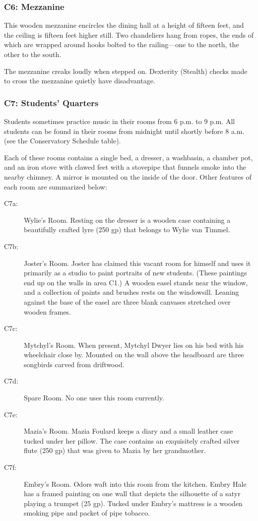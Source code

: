 \documentclass[10pt,a4paper,twoside,bg=print,twocolumn,openany,nodeprecatedcode]{dndbook}
\begin{document}
\subsubsection{C6: Mezzanine}
\begin{DndReadAloud}{}
This wooden mezzanine encircles the dining hall at a height of fifteen feet, and the ceiling is fifteen feet higher still. Two chandeliers hang from ropes, the ends of which are wrapped around hooks bolted to the railing—one to the north, the other to the south.

\end{DndReadAloud}

The mezzanine creaks loudly when stepped on. Dexterity (Stealth) checks made to cross the mezzanine quietly have disadvantage.

\subsubsection{C7: Students' Quarters}
Students sometimes practice music in their rooms from 6 p.m. to 9 p.m. All students can be found in their rooms from midnight until shortly before 8 a.m. (see the Conservatory Schedule table).

Each of these rooms contains a single bed, a dresser, a washbasin, a chamber pot, and an iron stove with clawed feet with a stovepipe that funnels smoke into the nearby chimney. A mirror is mounted on the inside of the door. Other features of each room are summarized below:


\begin{description}
\item[C7a:]
Wylie's Room. Resting on the dresser is a wooden case containing a beautifully crafted lyre (250 gp) that belongs to Wylie van Timmel.
\item[C7b:]
Joster's Room. Joster has claimed this vacant room for himself and uses it primarily as a studio to paint portraits of new students. (These paintings end up on the walls in area C1.) A wooden easel stands near the window, and a collection of paints and brushes rests on the windowsill. Leaning against the base of the easel are three blank canvases stretched over wooden frames.
\item[C7c:]
Mytchyl's Room. When present, Mytchyl Dwyer lies on his bed with his wheelchair close by. Mounted on the wall above the headboard are three songbirds carved from driftwood.
\item[C7d:]
Spare Room. No one uses this room currently.
\item[C7e:]
Mazia's Room. Mazia Foulard keeps a diary and a small leather case tucked under her pillow. The case contains an exquisitely crafted silver flute (250 gp) that was given to Mazia by her grandmother.
\item[C7f:]
Embry's Room. Odors waft into this room from the kitchen. Embry Hale has a framed painting on one wall that depicts the silhouette of a satyr playing a trumpet (25 gp). Tucked under Embry's mattress is a wooden smoking pipe and packet of pipe tobacco.
\end{description}
\end{document}
